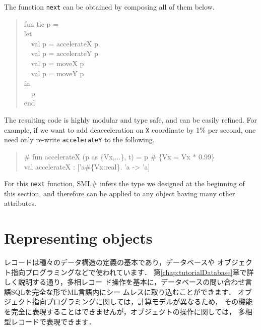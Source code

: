 \documentclass{jbook}
\newcommand{\txt}[2]{#2}
\newcommand{\smlsharp}{SML\#}
\newcommand{\myem}{\mbox{\ \ }}
\begin{document}
	The function {\tt next} can be obtained by composing all of them
below.
\begin{tt}\begin{quote}
fun tic p =\\
let\\
\myem  val p = accelerateX p\\
\myem  val p = accelerateY p\\
\myem  val p = moveX p\\
\myem  val p = moveY p\\
in\\
\myem  p\\
end
\end{quote}\end{tt}
	The resulting code is highly modular and type safe, and can be
easily refined.
	For example, if we want to add deacceleration on {\tt X}
coordinate by 1\% per second, one need only re-write {\tt accelerateY}
to the following.
\begin{tt}\begin{quote}
\# fun accelerateX (p as \{Vx,...\}, t) = p \# \{Vx = Vx * 0.99\}\\
val accelerateX : ['a\#\{Vx:real\}. 'a -> 'a]\\
\end{quote}\end{tt}

	For this {\tt next} function, \smlsharp{} infers the type we 
designed at the beginning of this section, and therefore can be applied
to any object having many other attributes.
\fi%


\section{\txt{オブジェクトの表現}{Representing objects}}
\label{sec:extensionObject}

\ifjp%
	レコードは種々のデータ構造の定義の基本であり，データベースや
オブジェクト指向プログラミングなどで使われています．
	第\ref{chap:tutorialDatabase}章で詳しく説明する通り，多相レコー
ド操作を基本に，データベースの問い合わせ言語SQLを完全な形でML言語内にシー
ムレスに取り込むことができます．
	オブジェクト指向プログラミングに関しては，計算モデルが異なるため，
その機能を完全に表現することはできませんが，オブジェクトの操作に関しては，
多相型レコードで表現できます．
	
\end{document}
